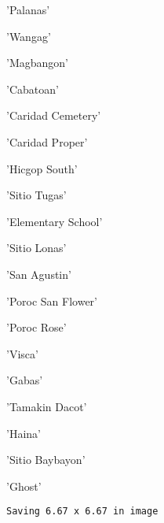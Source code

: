 \documentclass[11pt]{article}
\begin{document}
    \begin{enumerate*}
\item 'Palanas'
\item 'Wangag'
\item 'Magbangon'
\item 'Cabatoan'
\item 'Caridad Cemetery'
\item 'Caridad Proper'
\item 'Hicgop South'
\item 'Sitio Tugas'
\item 'Elementary School'
\item 'Sitio Lonas'
\item 'San Agustin'
\item 'Poroc San Flower'
\item 'Poroc Rose'
\item 'Visca'
\item 'Gabas'
\item 'Tamakin Dacot'
\item 'Haina'
\item 'Sitio Baybayon'
\item 'Ghost'
\end{enumerate*}


    
    
    
    \begin{Verbatim}[commandchars=\\\{\}]
Saving 6.67 x 6.67 in image

    \end{Verbatim}

    \begin{center}
    \end{center}
    { \hspace*{\fill} \\}
    
\end{document}
